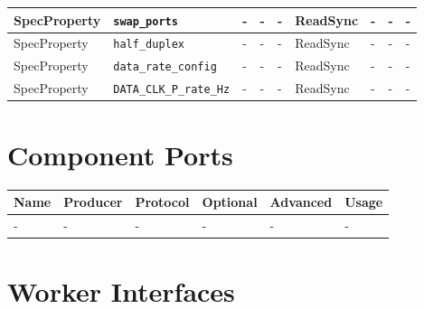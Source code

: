 \documentclass{article}
\begin{document}
\begin{landscape}
\begin{scriptsize}
\begin{longtable}{|p{2cm}|p{4cm}|p{1cm}|p{2cm}|p{2cm}|p{2cm}|p{2cm}|p{1cm}|p{4.58cm}|}
			\hline
			SpecProperty & \verb+swap_ports+ & - & - & - & ReadSync & - & - & - \\
			\hline
			SpecProperty & \verb+half_duplex+ & - & - & - & ReadSync & - & - & - \\
			\hline
			SpecProperty & \verb+data_rate_config+ & - & - & - & ReadSync & - & - & - \\
			\hline
			SpecProperty & \verb+DATA_CLK_P_rate_Hz+ & - & - & - & ReadSync  & - & - & - \\
			\hline
		\end{longtable}
	\end{scriptsize}
\pagebreak
	\section*{Component Ports}
	\begin{scriptsize}
		\begin{tabular}{|p{2cm}|p{1.5cm}|p{4cm}|p{1.5cm}|p{1.5cm}|p{9.38cm}|}
			\hline
			\rowcolor{blue}
			Name & Producer & Protocol           & Optional & Advanced & Usage                  \\
			\hline
			-  & -     & - & -     & -        & - \\
			\hline
		\end{tabular}
	\end{scriptsize}
	\section*{Worker Interfaces}

\end{landscape}
\end{document}

